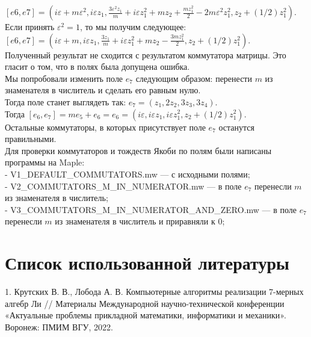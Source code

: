 \documentclass[12pt]{article}
\begin{document}
$[e6, e7] = \left(i \varepsilon + m \varepsilon^2, i \varepsilon z_1, \frac{3 \varepsilon^2 z_1}{m} + i \varepsilon z_1^2 + m z_2 + \frac{m z_1^2}{2} - 2 m \varepsilon^2 z_1^2, z_2 + (1/2)z_1^2 \right)$. \\

Если принять $\varepsilon^2 = 1$, то мы получим следующее: \\

$[e6, e7] = \left(i \varepsilon + m, i \varepsilon z_1, \frac{3 z_1}{m} + i \varepsilon z_1^2 + m z_2 - \frac{3m z_1^2}{2}, z_2 + (1/2)z_1^2 \right)$. \\

Полученный результат не сходится с результатом коммутатора матрицы. Это гласит о том, что в полях была допущена ошибка. \\

Мы попробовали изменить поле $e_7$ следующим образом: перенести $m$ из знаменателя в числитель и сделать его равным нулю. \\

Тогда поле станет выглядеть так: $e_7 = (z_1, 2z_2, 3z_3, 3z_4).$ \\

Тогда $[e_6, e_7] = me_5 + e_6 = e_6 = \left(i \varepsilon, i \varepsilon z_1, i \varepsilon z_1^2, z_2 + (1/2)z_1^2 \right).$ \\

Остальные коммутаторы, в которых присутствует поле $e_7$ останутся правильными. \\

Для проверки коммутаторов и тождеств Якоби по полям были написаны программы на Maple: \\

- V1_DEFAULT_COMMUTATORS.mw — с исходными полями; \\

- V2_COMMUTATORS_M_IN_NUMERATOR.mw — в поле $e_7$ перенесли $m$ из знаменателя в числитель; \\

- V3_COMMUTATORS_M_IN_NUMERATOR_AND_ZERO.mw — в поле $e_7$ перенесли $m$ из знаменателя в числитель и приравняли к 0;

\pagebreak
\section{Список использованной литературы}

1. Крутских В. В., Лобода А. В. Компьютерные алгоритмы реализации 7-мерных алгебр Ли // Материалы Международной научно-технической конференции «Актуальные проблемы прикладной математики, информатики и механики». Воронеж: ПМИМ ВГУ, 2022.
\end{document}
